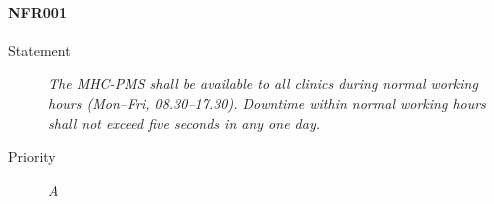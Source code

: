 \paragraph{NFR001}
\begin{description}
  \item [Statement] \textit{The MHC-PMS shall be available to all clinics
  during normal working hours (Mon–Fri, 08.30–17.30). Downtime within normal
  working hours shall not exceed five seconds in any one day.}
  \item [Priority] \textit{A}
\end{description}
